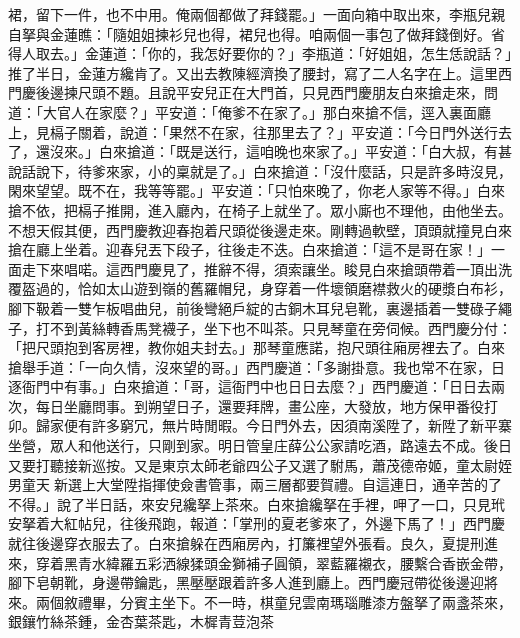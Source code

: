 裙，留下一件，也不中用。俺兩個都做了拜錢罷。」一面向箱中取出來，李瓶兒親自拏與金蓮瞧：「隨姐姐揀衫兒也得，裙兒也得。咱兩個一事包了做拜錢倒好。省得人取去。」金蓮道：「你的，我怎好要你的？」李瓶道：「好姐姐，怎生恁說話？」推了半日，金蓮方纔肯了。又出去教陳經濟換了腰封，寫了二人名字在上。這里西門慶後邊揀尺頭不題。且說平安兒正在大門首，只見西門慶朋友白來搶走來，問道：「大官人在家麼？」平安道：「俺爹不在家了。」那白來搶不信，逕入裏面廳上，見槅子關着，說道：「果然不在家，往那里去了？」平安道：「今日門外送行去了，還沒來。」白來搶道：「既是送行，這咱晚也來家了。」平安道：「白大叔，有甚說話說下，待爹來家，小的稟就是了。」白來搶道：「沒什麼話，只是許多時沒見，閑來望望。既不在，我等等罷。」平安道：「只怕來晚了，你老人家等不得。」白來搶不依，把槅子推開，進入廳內，在椅子上就坐了。眾小廝也不理他，由他坐去。不想天假其便，西門慶教迎春抱着尺頭從後邊走來。剛轉過軟壁，頂頭就撞見白來搶在廳上坐着。迎春兒丟下段子，往後走不迭。白來搶道：「這不是哥在家！」一面走下來唱喏。這西門慶見了，推辭不得，須索讓坐。睃見白來搶頭帶着一頂出洗覆盔過的，恰如太山遊到嶺的舊羅帽兒，身穿着一件壞領磨襟救火的硬漿白布衫，腳下靸着一雙乍板唱曲兒，前後彎絕戶綻的古銅木耳兒皂靴，裏邊插着一雙碌子繩子，打不到黃絲轉香馬凳襪子，坐下也不叫茶。只見琴童在旁伺候。西門慶分付：「把尺頭抱到客房裡，教你姐夫封去。」那琴童應諾，抱尺頭往廂房裡去了。白來搶舉手道：「一向久情，沒來望的哥。」西門慶道：「多謝掛意。我也常不在家，日逐衙門中有事。」白來搶道：「哥，這衙門中也日日去麼？」西門慶道：「日日去兩次，每日坐廳問事。到朔望日子，還要拜牌，畫公座，大發放，地方保甲番役打卯。歸家便有許多窮冗，無片時閒暇。今日門外去，因須南溪陞了，新陞了新平寨坐營，眾人和他送行，只剛到家。明日管皇庄薛公公家請吃酒，路遠去不成。後日又要打聽接新巡按。又是東京太師老爺四公子又選了駙馬，蕭茂德帝姬，童太尉姪男童天新選上大堂陞指揮使僉書管事，兩三層都要賀禮。自這連日，通辛苦的了不得。」說了半日話，來安兒纔拏上茶來。白來搶纔拏在手裡，呷了一口，只見玳安拏着大紅帖兒，往後飛跑，報道：「掌刑的夏老爹來了，外邊下馬了！」西門慶就往後邊穿衣服去了。白來搶躲在西廂房內，打簾裡望外張看。良久，夏提刑進來，穿着黑青水緯羅五彩洒線猱頭金獅補子圓領，翠藍羅襯衣，腰繫合香嵌金帶，腳下皂朝靴，身邊帶鑰匙，黑壓壓跟着許多人進到廳上。西門慶冠帶從後邊迎將來。兩個敘禮畢，分賓主坐下。不一時，棋童兒雲南瑪瑙雕漆方盤拏了兩盞茶來，銀鑲竹絲茶鍾，金杏葉茶匙，木樨青荳泡茶 
